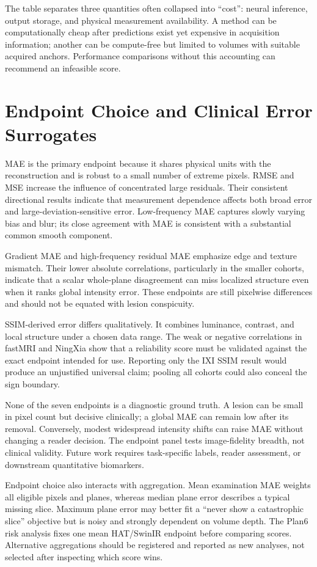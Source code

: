 \documentclass[journal,10pt]{IEEEtran}
\begin{document}
The table separates three quantities often collapsed into ``cost'': neural inference, output storage, and physical measurement availability. A method can be computationally cheap after predictions exist yet expensive in acquisition information; another can be compute-free but limited to volumes with suitable acquired anchors. Performance comparisons without this accounting can recommend an infeasible score.

\section{Endpoint Choice and Clinical Error Surrogates}
MAE is the primary endpoint because it shares physical units with the reconstruction and is robust to a small number of extreme pixels. RMSE and MSE increase the influence of concentrated large residuals. Their consistent directional results indicate that measurement dependence affects both broad error and large-deviation-sensitive error. Low-frequency MAE captures slowly varying bias and blur; its close agreement with MAE is consistent with a substantial common smooth component.

Gradient MAE and high-frequency residual MAE emphasize edge and texture mismatch. Their lower absolute correlations, particularly in the smaller cohorts, indicate that a scalar whole-plane disagreement can miss localized structure even when it ranks global intensity error. These endpoints are still pixelwise differences and should not be equated with lesion conspicuity.

SSIM-derived error differs qualitatively. It combines luminance, contrast, and local structure under a chosen data range. The weak or negative correlations in fastMRI and NingXia show that a reliability score must be validated against the exact endpoint intended for use. Reporting only the IXI SSIM result would produce an unjustified universal claim; pooling all cohorts could also conceal the sign boundary.

None of the seven endpoints is a diagnostic ground truth. A lesion can be small in pixel count but decisive clinically; a global MAE can remain low after its removal. Conversely, modest widespread intensity shifts can raise MAE without changing a reader decision. The endpoint panel tests image-fidelity breadth, not clinical validity. Future work requires task-specific labels, reader assessment, or downstream quantitative biomarkers.

Endpoint choice also interacts with aggregation. Mean examination MAE weights all eligible pixels and planes, whereas median plane error describes a typical missing slice. Maximum plane error may better fit a ``never show a catastrophic slice'' objective but is noisy and strongly dependent on volume depth. The Plan6 risk analysis fixes one mean HAT/SwinIR endpoint before comparing scores. Alternative aggregations should be registered and reported as new analyses, not selected after inspecting which score wins.
\end{document}
